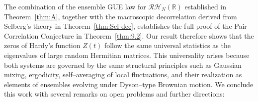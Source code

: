 \documentclass[12pt,reqno]{amsart}
\theoremstyle{plain}
\theoremstyle{definition}
\theoremstyle{remark}
\begin{document}
The combination of the ensemble GUE law for $\mathcal{RH}_N(\mathbb{R})$ established in Theorem~\ref{thm:A}, 
together with the macroscopic decorrelation derived from Selberg’s theory in Theorem~\ref{thm:Sel-dec}, 
establishes the full proof of the Pair--Correlation Conjecture in Theorem~\ref{thm:9.2}.  
Our result therefore shows that the zeros of Hardy’s function $Z(t)$ 
follow the same universal statistics as the eigenvalues of large random Hermitian matrices.  
This universality arises because both systems are governed by the same structural principles such as
Gaussian mixing, ergodicity, self–averaging of local fluctuations, 
and their realization as elements of ensembles evolving under Dyson–type Brownian motion. We conclude this work with several remarks on open problems and further directions: 
\end{document}

